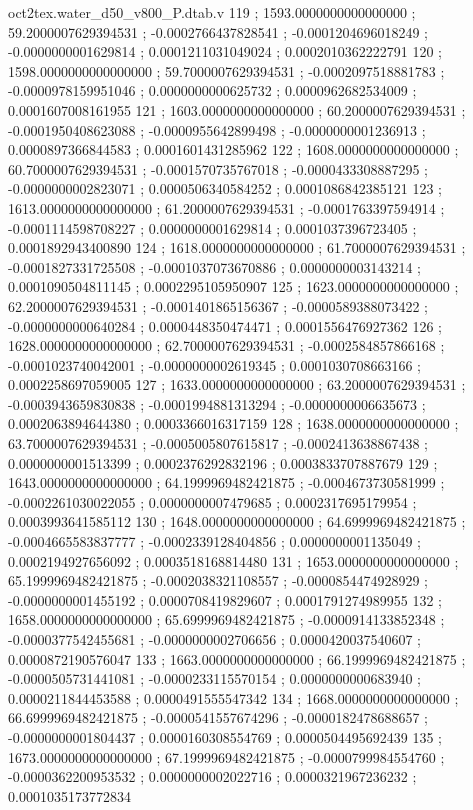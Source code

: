 \begin{filecontents}[overwrite]{oct2tex.water_d50_v800_P.dtab.v}
119 ; 1593.0000000000000000 ; 59.2000007629394531 ; -0.0002766437828541 ; -0.0001204696018249 ; -0.0000000001629814 ; 0.0001211031049024 ; 0.0002010362222791
120 ; 1598.0000000000000000 ; 59.7000007629394531 ; -0.0002097518881783 ; -0.0000978159951046 ; 0.0000000000625732 ; 0.0000962682534009 ; 0.0001607008161955
121 ; 1603.0000000000000000 ; 60.2000007629394531 ; -0.0001950408623088 ; -0.0000955642899498 ; -0.0000000001236913 ; 0.0000897366844583 ; 0.0001601431285962
122 ; 1608.0000000000000000 ; 60.7000007629394531 ; -0.0001570735767018 ; -0.0000433308887295 ; -0.0000000002823071 ; 0.0000506340584252 ; 0.0001086842385121
123 ; 1613.0000000000000000 ; 61.2000007629394531 ; -0.0001763397594914 ; -0.0001114598708227 ; 0.0000000001629814 ; 0.0001037396723405 ; 0.0001892943400890
124 ; 1618.0000000000000000 ; 61.7000007629394531 ; -0.0001827331725508 ; -0.0001037073670886 ; 0.0000000003143214 ; 0.0001090504811145 ; 0.0002295105950907
125 ; 1623.0000000000000000 ; 62.2000007629394531 ; -0.0001401865156367 ; -0.0000589388073422 ; -0.0000000000640284 ; 0.0000448350474471 ; 0.0001556476927362
126 ; 1628.0000000000000000 ; 62.7000007629394531 ; -0.0002584857866168 ; -0.0001023740042001 ; -0.0000000002619345 ; 0.0001030708663166 ; 0.0002258697059005
127 ; 1633.0000000000000000 ; 63.2000007629394531 ; -0.0003943659830838 ; -0.0001994881313294 ; -0.0000000006635673 ; 0.0002063894644380 ; 0.0003366016317159
128 ; 1638.0000000000000000 ; 63.7000007629394531 ; -0.0005005807615817 ; -0.0002413638867438 ; 0.0000000001513399 ; 0.0002376292832196 ; 0.0003833707887679
129 ; 1643.0000000000000000 ; 64.1999969482421875 ; -0.0004673730581999 ; -0.0002261030022055 ; 0.0000000007479685 ; 0.0002317695179954 ; 0.0003993641585112
130 ; 1648.0000000000000000 ; 64.6999969482421875 ; -0.0004665583837777 ; -0.0002339128404856 ; 0.0000000001135049 ; 0.0002194927656092 ; 0.0003518168814480
131 ; 1653.0000000000000000 ; 65.1999969482421875 ; -0.0002038321108557 ; -0.0000854474928929 ; -0.0000000001455192 ; 0.0000708419829607 ; 0.0001791274989955
132 ; 1658.0000000000000000 ; 65.6999969482421875 ; -0.0000914133852348 ; -0.0000377542455681 ; -0.0000000002706656 ; 0.0000420037540607 ; 0.0000872190576047
133 ; 1663.0000000000000000 ; 66.1999969482421875 ; -0.0000505731441081 ; -0.0000233115570154 ; 0.0000000000683940 ; 0.0000211844453588 ; 0.0000491555547342
134 ; 1668.0000000000000000 ; 66.6999969482421875 ; -0.0000541557674296 ; -0.0000182478688657 ; -0.0000000001804437 ; 0.0000160308554769 ; 0.0000504495692439
135 ; 1673.0000000000000000 ; 67.1999969482421875 ; -0.0000799984554760 ; -0.0000362200953532 ; 0.0000000002022716 ; 0.0000321967236232 ; 0.0001035173772834

\end{filecontents}
